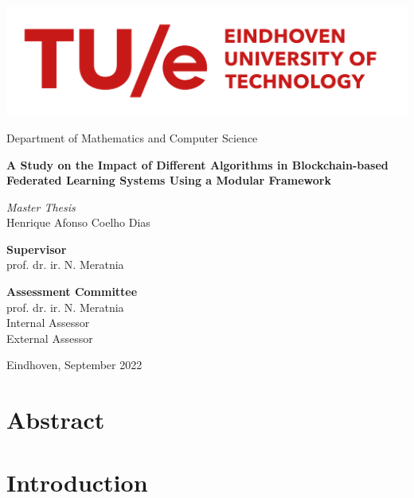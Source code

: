 \documentclass[12pt,a4paper,oneside]{book}
\begin{document}

\begin{titlepage}
\centering
\includegraphics[width=0.7\linewidth]{graphics/tue-logo.png}\par
Department of Mathematics and Computer Science

\vspace{3cm}

{\sffamily\LARGE\textbf{
A Study on the Impact of Different Algorithms in Blockchain-based Federated Learning Systems Using a Modular Framework
}}

\par\vspace{2cm}
{\large\textit{Master Thesis}}\\
\vspace{0.2cm}
{\large Henrique Afonso Coelho Dias}

\vspace{2cm}

\textbf{Supervisor} \\
\vspace{0.1cm}
prof. dr. ir. N. Meratnia

\par

\textbf{Assessment Committee} \\
\vspace{0.1cm}
prof. dr. ir. N. Meratnia \\
Internal Assessor \\
External Assessor \\

\vfill

{Eindhoven, September 2022}

\end{titlepage}

\chapter*{Abstract}\label{chapter:abstract}


\tableofcontents

\listoffigures

\listoftables

\chapter{Introduction}\label{chapter:introduction}

\end{document}
